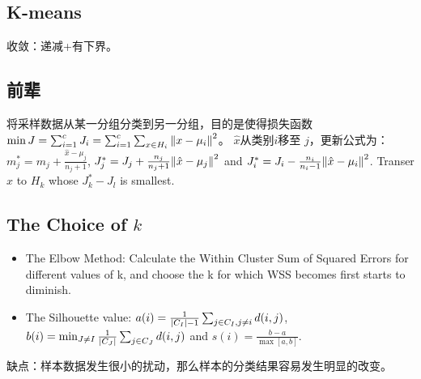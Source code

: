 \documentclass[a4paper,landscape]{article}
\begin{document}
\begin{tiny}
\begin{multicols}{4}

		\section{K-means}收敛：递减+有下界。

		\subsection{前辈}
		将采样数据从某一分组分类到另一分组，目的是使得损失函数$\min J=\sum_{i=1}^c J_i=\sum_{i=1}^c\sum_{x\in H_i}\norm{x-\mu_i}^2$。
		$\hat{x}$从类别$i$移至 $j$，更新公式为： $m^*_j=m_j+\frac{\hat{x}-\mu_j}{n_j+1}$, $J^*_j=J_j+\frac{n_j}{n_j+1}\norm{\hat{x}-\mu_j}^2$ and $J^*_i=J_i-\frac{n_i}{n_i-1}\norm{\hat{x}-\mu_i}^2$. Transer $\hat{x}$ to $H_k$ whose $J^*_k-J_l$ is smallest.

		\subsection{The Choice of $k$}
		\begin{itemize}
			\item The Elbow Method: Calculate the Within Cluster Sum of Squared Errors for different values of k, and choose the k for which WSS becomes first starts to diminish.
			\item
			      The Silhouette value:
			      $a(i)=\frac{1}{\qty|C_I|-1}\sum_{j\in C_I,j\ne i}d(i,j)$,
			      $b(i)=\min_{J\ne I}\frac{1}{\qty|C_J|}\sum_{j\in C_J}d(i,j)$
			      and
			      $s(i)=\frac{b-a}{\max[a,b]}$.
		\end{itemize}
		缺点：样本数据发生很小的扰动，那么样本的分类结果容易发生明显的改变。


\end{multicols}
\end{tiny}
\end{document}
